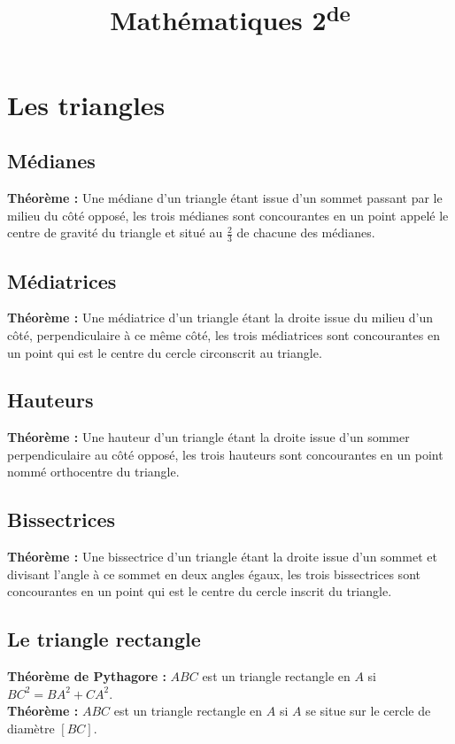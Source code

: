 \documentclass[a4paper,titlepage]{article}
\title{Mathématiques 2\textsuperscript{de}}
\author{}
\date{}
\let\oldsection\section
\renewcommand\section{\clearpage\oldsection}
\begin{document}
\setlength{\abovedisplayskip}{0cm}
\setlength{\belowdisplayskip}{0cm}
\setlength{\abovedisplayshortskip}{0cm}
\setlength{\belowdisplayshortskip}{0cm}
\setlength{\jot}{0cm}
\maketitle
\null\newpage
\null\newpage
\tableofcontents
\null\newpage
\null\newpage
\null\newpage
{}
\section{Les triangles}
    \subsection{Médianes}
        \textbf{Théorème :} Une médiane d’un triangle étant issue d’un sommet passant par le milieu du côté opposé, les trois médianes sont concourantes en un point appelé le centre de gravité du triangle et situé au $\frac{2}{3}$ de chacune des médianes.
    \subsection{Médiatrices}
        \textbf{Théorème :} Une médiatrice d’un triangle étant la droite issue du milieu d’un côté, perpendiculaire à ce même côté, les trois médiatrices sont concourantes en un point qui est le centre du cercle circonscrit au triangle.
    \subsection{Hauteurs}
        \textbf{Théorème :} Une hauteur d’un triangle étant la droite issue d’un sommer perpendiculaire au côté opposé, les trois hauteurs sont concourantes en un point nommé orthocentre du triangle.
    \subsection{Bissectrices}
        \textbf{Théorème :} Une bissectrice d’un triangle étant la droite issue d’un sommet et divisant l’angle à ce sommet en deux angles égaux, les trois bissectrices sont concourantes en un point qui est le centre du cercle inscrit du triangle.
    \subsection{Le triangle rectangle}
        \textbf{Théorème de Pythagore :} $ABC$ est un triangle rectangle en $A$ si $BC^{2}=BA^{2}+CA^{2}$.
        \\
        \textbf{Théorème :} $ABC$ est un triangle rectangle en $A$ si $A$ se situe sur le cercle de diamètre $\left[BC\right]$.
\end{document}

